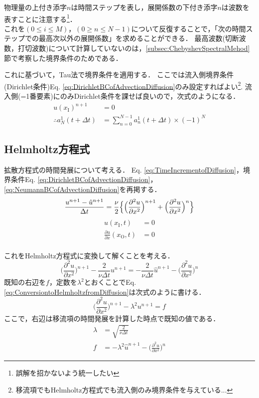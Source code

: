 \documentclass[12pt,a4paper]{jsarticle}
\begin{document}
物理量の上付き添字$n$は時間ステップを表し，展開係数の下付き添字$n$は波数を表すことに注意する\footnote{誤解を招かないよう統一したい}．\\

これを$(0 \le i \le M)$，$(0 \ge n \le N-1)$について反復することで，「次の時間ステップでの最高次以外の展開係数」を求めることができる．
最高波数(切断波数，打切波数)について計算していないのは，\ref{subsec:ChebyshevSpectralMehod}節で考察した境界条件のためである．

これに基づいて，Tau法で境界条件を適用する．
ここでは流入側境界条件(Dirichlet条件)Eq. \ref{eq:DirichletBCofAdvectionDiffusion}のみ設定すればよい\footnote{移流項でもHelmholtz方程式でも流入側のみ境界条件を与えている...}.
流入側(=1番要素)にのみDirichlet条件を課せば良いので，次式のようになる．
\begin{align}
  u(x_{\text{I}})^{n+1} &= 0 \nonumber \\
  \therefore a_{N}^1 (t+\Delta t) &= \sum_{n=0}^{N-1} a_{n}^1 (t+\Delta t) \times (-1)^N
\label{eq:BCofAdvection}
\end{align}



\subsection{Helmholtz方程式}
\label{sec:Helmholtz_Equation}

拡散方程式の時間発展について考える．
Eq. \ref{eq:TimeIncrementofDiffusion}，境界条件Eq. \ref{eq:DirichletBCofAdvectionDiffusion}，\ref{eq:NeumannBCofAdvectionDiffusion}を再掲する．
\begin{equation*}
  \frac{u^{n+1} -\hat{u}^{n+1}}{\Delta t} = \frac{\nu}{2} \Bigl\{ \Big( \frac{\partial^2 u}{\partial x^2} \Big)^{n+1} +\Big( \frac{\partial^2 u}{\partial x^2} \Big)^{n} \Bigr\}
\end{equation*}
\begin{align*}
  u(x_{\mathrm{I}},t) &= 0 \\
  \frac{\partial u}{\partial x}(x_{\mathrm{O}},t) &= 0
\end{align*}\\
これをHelmholtz方程式に変換して解くことを考える．
\begin{equation}
  \Big( \frac{\partial^2 u}{\partial x^2} \Big)^{n+1} -\frac{2}{\nu \Delta t} u^{n+1} = -\frac{2}{\nu \Delta t} \hat{u}^{n+1} -\Big( \frac{\partial^2 u}{\partial x^2} \Big)^{n}
\label{eq:ConversiontoHelmholtzfromDiffusion}
\end{equation}
既知の右辺を$f$，定数を$\lambda^2$とおくことでEq. \ref{eq:ConversiontoHelmholtzfromDiffusion}は次式のように書ける．
\begin{equation}
  \Big( \frac{\partial^2 u}{\partial x^2} \Big)^{n+1} -\lambda^2 u^{n+1} = f
  \label{eq:HelmholtzofDiffusion}
\end{equation}
ここで，右辺は移流項の時間発展を計算した時点で既知の値である．
\begin{align}
  \lambda &= \sqrt{\frac{2}{\nu \Delta t}} \\
  f &= -\lambda^2 \hat{u}^{n+1} -\Big( \frac{\partial^2 u}{\partial x^2} \Big)^{n}
\label{eq:Lambda_fofHelmholtz}
\end{align}
\end{document}
